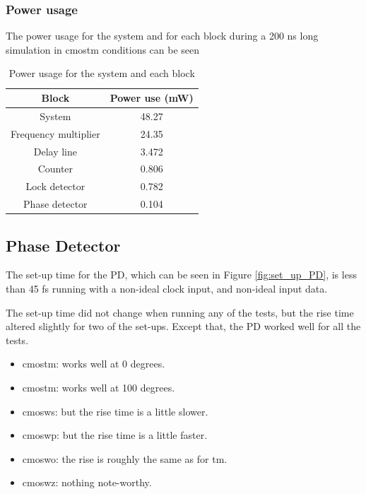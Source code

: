 \documentclass[a4paper,12pt]{article} \usepackage{graphicx}
\begin{document}
\subsubsection{Power usage}
The power usage for the system and for each block during a 200 ns long
simulation in cmostm conditions can be seen    
\begin{table}[h]
        \centering
        \begin{tabular}{|c|c|}
                \hline
                \textbf{Block} & \textbf{Power use (mW)}  \\
                \hline
                System & 48.27\\
                Frequency multiplier & 24.35 \\
                Delay line & 3.472 \\
                Counter & 0.806 \\
                Lock detector & 0.782 \\
                Phase detector & 0.104 \\
                \hline
        \end{tabular}
        \caption{Power usage for the system and each block}
        \label{tab:WS_power}
\end{table}


\subsection{Phase Detector}
The set-up time for the PD, which can be seen in Figure \ref{fig:set_up_PD}, is less than 45 fs
running with a non-ideal clock input, and non-ideal input data.

The set-up time did not change when running any of the tests, but the rise time altered slightly
for two of the set-ups. Except that, the PD worked well for all the tests.

\begin{itemize}
        \item cmostm: works well at 0 degrees.
        \item cmostm: works well at 100 degrees.
        \item cmosws: but the rise time is a little slower.
        \item cmoswp: but the rise time is a little faster.
        \item cmoswo: the rise is roughly the same as for tm.
        \item cmoswz: nothing note-worthy.
\end{itemize}
\end{document}
